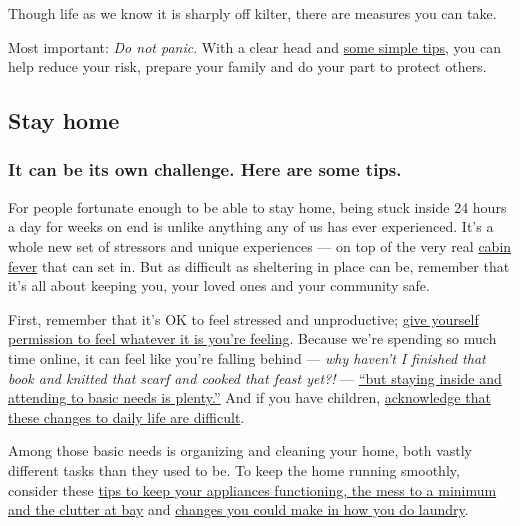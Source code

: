 Though life as we know it is sharply off kilter, there are measures you
can take.

Most important: \emph{Do not panic}. With a clear head and
\href{https://www.nytimes3xbfgragh.onion/2020/03/10/us/politics/coronavirus-guidelines.html}{some
simple tips}, you can help reduce your risk, prepare your family and do
your part to protect others.

\hypertarget{stay-home}{%
\subsection{Stay home}\label{stay-home}}

\hypertarget{it-can-be-its-own-challenge-here-are-some-tips}{%
\subsubsection{It can be its own challenge. Here are some
tips.}\label{it-can-be-its-own-challenge-here-are-some-tips}}

For people fortunate enough to be able to stay home, being stuck inside
24 hours a day for weeks on end is unlike anything any of us has ever
experienced. It's a whole new set of stressors and unique experiences
--- on top of the very real
\href{https://www.nytimes3xbfgragh.onion/2020/03/25/business/coronavirus-families-cabin-fever.html}{cabin
fever} that can set in. But as difficult as sheltering in place can be,
remember that it's all about keeping you, your loved ones and your
community safe.

First, remember that it's OK to feel stressed and unproductive;
\href{https://www.nytimes3xbfgragh.onion/2020/03/23/smarter-living/coronavirus-coping-tips.html}{give
yourself permission to feel whatever it is you're feeling}. Because
we're spending so much time online, it can feel like you're falling
behind --- \emph{why haven't I finished that book and knitted that scarf
and cooked that feast yet?!} ---
\href{https://www.nytimes3xbfgragh.onion/2020/04/01/style/productivity-coronavirus.html}{``but
staying inside and attending to basic needs is plenty.''} And if you
have children,
\href{https://www.nytimes3xbfgragh.onion/2020/04/01/parenting/coronavirus-help-anxious-kid.html}{acknowledge
that these changes to daily life are difficult}.

Among those basic needs is organizing and cleaning your home, both
vastly different tasks than they used to be. To keep the home running
smoothly, consider these
\href{https://www.nytimes3xbfgragh.onion/2020/04/02/smarter-living/protect-your-home-against-the-onslaught.html}{tips
to keep your appliances functioning, the mess to a minimum and the
clutter at bay} and
\href{https://www.nytimes3xbfgragh.onion/2020/03/26/style/how-to-do-laundry-coronavirus.html}{changes
you could make in how you do laundry}.


